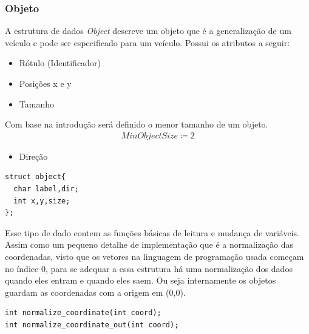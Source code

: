 \documentclass[11pt]{article}
\begin{document}
\subsubsection{Objeto}
\label{sec:org8efb438}
A estrutura de dados \emph{Object} descreve um objeto que é a generalização de um veículo e pode ser especificado para um veículo. Possui os atributos a seguir:
\begin{itemize}
\item Rótulo (Identificador)
\item Posições x e y
\item Tamanho
\end{itemize}
Com base na introdução será definido o menor tamanho de um objeto.
\begin{equation}\label{eq:MinObjectSize}
\begin{aligned}
MinObjectSize \coloneqq 2
\end{aligned}
\end{equation}

\begin{itemize}
\item Direção
\end{itemize}

\begin{verbatim}
struct object{
  char label,dir;
  int x,y,size;
};
\end{verbatim}

Esse tipo de dado contem as funções básicas de leitura e mudança de variáveis. Assim como um pequeno detalhe de implementação que é a normalização das coordenadas, visto que os vetores na linguagem de programação usada começam no índice 0, para se adequar a essa estrutura há uma normalização dos dados quando eles entram e quando eles saem. Ou seja internamente os objetos guardam as coordenadas com a origem em (0,0).

\begin{verbatim}
int normalize_coordinate(int coord);
int normalize_coordinate_out(int coord);
\end{verbatim}

\begin{center}
\end{center}
\end{document}
